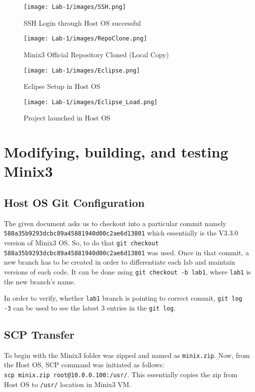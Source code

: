\documentclass[12pt]{article}
\begin{document}
\begin{figure}
    \centering
    \texttt{[image: Lab-1/images/SSH.png]}
    \caption{SSH Login through Host OS successful}
\end{figure}

\begin{figure}
    \centering
    \texttt{[image: Lab-1/images/RepoClone.png]}
    \caption{Minix3 Official Repository Cloned (Local Copy)}
\end{figure}

\begin{figure}
    \centering
    \texttt{[image: Lab-1/images/Eclipse.png]}
    \caption{Eclipse Setup in Host OS}
\end{figure}

\begin{figure}
    \centering
    \texttt{[image: Lab-1/images/Eclipse\_Load.png]}
    \caption{Project launched in Host OS}
\end{figure}

\section{Modifying, building, and testing Minix3}

\subsection{Host OS Git Configuration}
The given document asks us to checkout into a particular commit namely \\
\texttt{588a35b9293dcbc89a45881940d00c2ae6d13801} which essentially is the V3.3.0 version of Minix3 OS. So, to do that 
\texttt{git checkout 588a35b9293dcbc89a45881940d00c2ae6d13801} was used. Once in that commit, a new branch has to be created in order to differentiate each lab and maintain versions of each code. It can be done using \texttt{git checkout -b lab1}, where \texttt{lab1} is the new branch's name.

In order to verify, whether \texttt{lab1} branch is pointing to correct commit, \texttt{git log -3} can be used to see the latest 3 entries in the \texttt{git log}.

\subsection{SCP Transfer}
To begin with the Minix3 folder was zipped and named as \texttt{minix.zip}. Now, from the Host OS, SCP command was initiated as follows:\\
\texttt{scp minix.zip root@10.0.0.100:/usr/}. This essentially copies the zip from Host OS to \texttt{/usr/} location in Minix3 VM.
\end{document}
